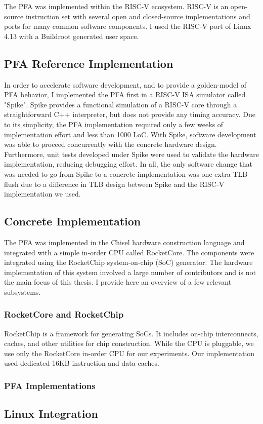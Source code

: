 The PFA was implemented within the RISC-V ecosystem. RISC-V is an open-source instruction set with several open and closed-source implementations and ports for many common software components\cite{riscv}. I used the RISC-V port of Linux 4.13\cite{rvLinux} with a Buildroot generated user space\cite{rvBuildroot}.

\subsection{PFA Reference Implementation}
In order to accelerate software development, and to provide a golden-model of PFA behavior, I implemented the PFA first in a RISC-V ISA simulator called "Spike"\cite{spike}. Spike provides a functional simulation of a RISC-V core through a straightforward C++ interpreter, but does not provide any timing accuracy. Due to its simplicity, the PFA implementation required only a few weeks of implementation effort and less than 1000 LoC. With Spike, software development was able to proceed concurrently with the concrete hardware design.  Furthermore, unit tests developed under Spike were used to validate the hardware implementation, reducing debugging effort. In all, the only software change that was needed to go from Spike to a concrete implementation was one extra TLB flush due to a difference in TLB design between Spike and the RISC-V implementation we used.

\subsection{Concrete Implementation}
The PFA was implemented in the Chisel hardware construction language\cite{chisel} and integrated with a simple in-order CPU called RocketCore\cite{rocketCore}. The components were integrated using the RocketChip system-on-chip (SoC) generator\cite{rocketChip}. The hardware implementation of this system involved a large number of contributors and is not the main focus of this thesis. I provide here an overview of a few relevant subsystems.

\subsubsection{RocketCore and RocketChip}
RocketChip is a framework for generating SoCs. It includes on-chip interconnects, caches, and other utilities for chip construction. While the CPU is pluggable, we use only the RocketCore in-order CPU for our experiments. Our implementation used dedicated 16KB instruction and data caches. 

\subsubsection{PFA Implementations}

\subsection{Linux Integration} \label{sec_linuxImpl}
    